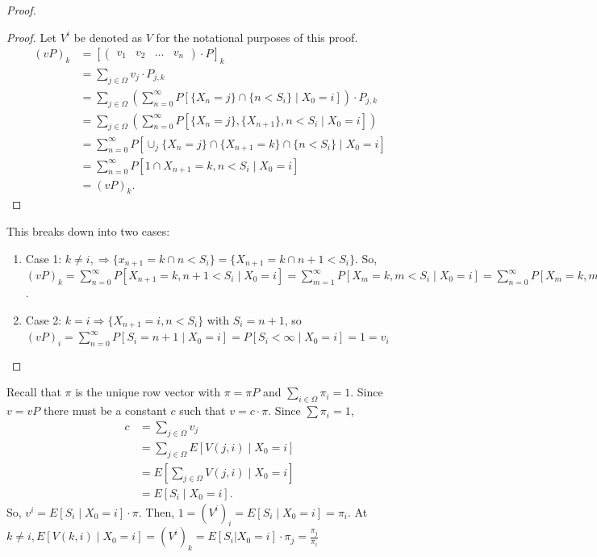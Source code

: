 \documentclass[a4paper]{article}
\begin{document}
\begin{corollary}
\begin{proof}
\begin{prop}
       \begin{proof}
         Let $V^{i}$ be denoted as $V$ for the notational purposes of this proof. 
          \begin{align*}
            (vP)_{k} &= [\begin{pmatrix} v_1 & v_2 & \ldots & v_n \end{pmatrix} \cdot P]_{k}\\
                     &= \sum_{j \in \Omega} v_j \cdot P_{j,k} \\
                     &= \sum_{j \in \Omega} \left( \sum_{n=0}^{\infty} P[\{X_n = j\} \cap \{n < S_i\} \mid X_0 =i] \right) \cdot P_{j,k} \\
                     &= \sum_{j \in \Omega} \left( \sum_{n = 0}^{\infty} P[\{X_n = j\}, \{X_{n+1}\}, n < S_i \mid X_0 =i ] \right) \\
                     &= \sum_{n=0}^{\infty} P[\cup_{j} \{X_n = j\} \cap \{X_{n+1} = k\} \cap \{n < S_i\} \mid X_0 =i] \\
                     &= \sum_{n=0}^{\infty} P[1 \cap X_{n+1}= k, n < S_i \mid X_0 = i] \\
                     &= (vP)_{k}
          .\end{align*}
       \end{proof}
    \end{prop}
    This breaks down into two cases:
    \begin{enumerate}
      \item Case 1: $k \neq i,  \Rightarrow  \{x_{n+1} = k \cap n < S_i\} = \{X_{n+1} = k \cap n + 1 < S_{i}\} $. So, $(vP)_{k} = \sum_{n = 0}^{\infty} P[X_{n+1} = k, n + 1 < S_i \mid X_0 = i] = \sum_{m=1}^{\infty} P[X_m = k, m < S_i \mid X_0 = i] = \sum_{n=0}^{\infty} P[X_m = k, m < S_i \mid  X_0 = i] = v_k$. 
      \item Case 2: $k = i \Rightarrow \{X_{n+1} = i, n < S_i\} $ with $S_i = n+1$, so  $(vP)_{i} = \sum_{n=0}^{\infty} P[S_i = n+1 \mid  X_0 = i] = P[S_i < \infty \mid  X_0 = i] = 1 = v_i$
\end{enumerate}

  \end{proof}


\end{corollary}

Recall that $\pi$ is the unique row vector with $\pi = \pi P$ and $\sum_{i \in \Omega} \pi_i = 1$. Since $v = vP$ there must be a constant  $c$ such that  $v = c \cdot \pi$. Since $\sum \pi_{i} = 1$, 
\begin{align*}
  c &= \sum_{j \in \Omega} v_j \\
    &= \sum_{j \in \Omega} E[V(j,i) \mid  X_0 = i] \\
    &= E[\sum_{j \in \Omega} V(j,i) \mid  X_0 = i] \\
    &= E[S_i \mid  X_0 = i] 
.\end{align*}
So, $v^{i} = E[S_i \mid X_0 =i] \cdot \pi$. Then, $1 = (V^{i})_{i} = E[S_i \mid  X_0 = i] = \pi_i$. At $k\neq i, E[V(k,i) \mid X_0 =i] = (V^{i})_{k} = E[S_i | X_{0} = i] \cdot \pi_{j} = \frac{\pi_j}{\pi_i}$ 
\end{document}
